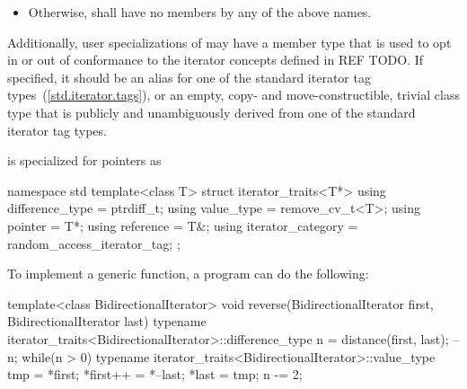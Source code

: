 \begin{itemize}

\item
Otherwise, 
shall have no members by any of the above names.
\end{itemize}

\begin{addedblock}
\pnum
Additionally, user specializations of  may have a member
type  that is used to opt in or out of conformance to the
iterator concepts defined in REF TODO. If specified, it should be an alias for
one of the standard iterator tag types~(\ref{std.iterator.tags}), or an empty,
copy- and move-constructible, trivial class type that is publicly and
unambiguously derived from one of the standard iterator tag types.
\end{addedblock}

\pnum
{} is specialized for pointers as

\begin{codeblock}
namespace std {
  template<class T> struct iterator_traits<T*> {
    using difference_type   = ptrdiff_t;
    using value_type        = remove_cv_t<T>;
    using pointer           = T*;
    using reference         = T&;
    using iterator_category = random_access_iterator_tag;
  };
}
\end{codeblock}

\pnum
\begin{example}
To implement a generic
function, a \Cpp{} program can do the following:

\begin{codeblock}
template<class BidirectionalIterator>
void reverse(BidirectionalIterator first, BidirectionalIterator last) {
  typename iterator_traits<BidirectionalIterator>::difference_type n =
    distance(first, last);
  --n;
  while(n > 0) {
    typename iterator_traits<BidirectionalIterator>::value_type
     tmp = *first;
    *first++ = *--last;
    *last = tmp;
    n -= 2;
  }
}
\end{codeblock}
\end{example}

